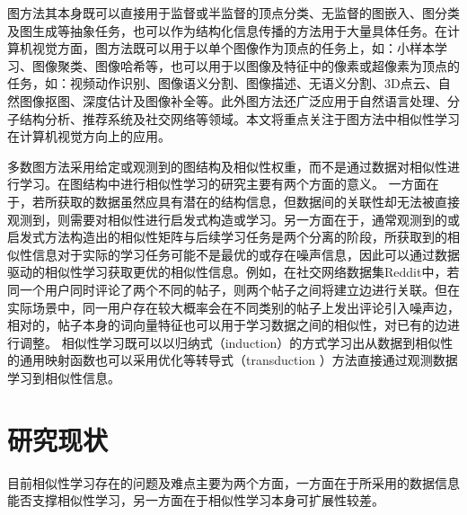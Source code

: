 图方法其本身既可以直接用于监督或半监督的顶点分类\cite{kipf2016semi,velivckovic2017graph,hamilton2017inductive}、无监督的图嵌入\cite{roweis2000nonlinear,belkin2001laplacian,perozzi2014deepwalk,kipf2016variational}、图分类\cite{shervashidze2011weisfeiler,defferrard2016convolutional,zhang2018end,xu2018how}及图生成\cite{simonovsky2018graphvae,de2018molgan,li2018learning}等抽象任务，也可以作为结构化信息传播的方法用于大量具体任务。在计算机视觉方面，图方法既可以用于以单个图像作为顶点的任务上，如：小样本学习\cite{garcia2018fewshot}、图像聚类\cite{blaschko2008correlational}、图像哈希\cite{weiss2009spectral}等，也可以用于以图像及特征中的像素或超像素为顶点的任务，如：视频动作识别\cite{wang2018non}、图像语义分割\cite{huang2019interlaced}、图像描述\cite{yao2018exploring}、无语义分割\cite{shi2000normalized}、3D点云\cite{wang2019dynamic}、自然图像抠图\cite{levin2008closed}、深度估计\cite{cheng2018depth}及图像补全\cite{yu2018generative}等。此外图方法还广泛应用于自然语言处理\cite{vaswani2017attention}、分子结构分析\cite{kearnes2016molecular}、推荐系统\cite{ying2018graph}及社交网络\cite{hamilton2017inductive}等领域。本文将重点关注于图方法中相似性学习在计算机视觉方向上的应用。


多数图方法采用给定或观测到的图结构及相似性权重，而不是通过数据对相似性进行学习。在图结构中进行相似性学习的研究主要有两个方面的意义。
一方面在于，若所获取的数据虽然应具有潜在的结构信息，但数据间的关联性却无法被直接观测到，则需要对相似性进行启发式构造或学习。另一方面在于，通常观测到的或启发式方法构造出的相似性矩阵与后续学习任务是两个分离的阶段，所获取到的相似性信息对于实际的学习任务可能不是最优的或存在噪声信息，因此可以通过数据驱动的相似性学习获取更优的相似性信息。例如，在社交网络数据集Reddit\cite{hamilton2017inductive}中，若同一个用户同时评论了两个不同的帖子，则两个帖子之间将建立边进行关联。但在实际场景中，同一用户存在较大概率会在不同类别的帖子上发出评论引入噪声边，相对的，帖子本身的词向量特征也可以用于学习数据之间的相似性，对已有的边进行调整。
相似性学习既可以以归纳式（induction）的方式学习出从数据到相似性的通用映射函数\cite{meila2001learning}也可以采用优化等转导式（transduction ）方法直接通过观测数据学习到相似性信息\cite{nie2014clustering}。

\section{研究现状}

目前相似性学习存在的问题及难点主要为两个方面，一方面在于所采用的数据信息能否支撑相似性学习，另一方面在于相似性学习本身可扩展性较差。

